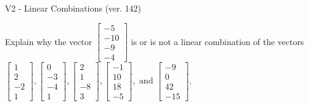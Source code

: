 \begin{exercise}
  \begin{exerciseTitle}V2 - Linear Combinations (ver. 142)\end{exerciseTitle}
  \begin{exerciseStatement}
    Explain why the vector \(\left[\begin{array}{c}
-5 \\
-10 \\
-9 \\
-4
\end{array}\right]\)  is or is not a linear 
	combination of the vectors \(\left[\begin{array}{c}
1 \\
2 \\
-2 \\
1
\end{array}\right] , \left[\begin{array}{c}
0 \\
-3 \\
-4 \\
1
\end{array}\right] , \left[\begin{array}{c}
2 \\
1 \\
-8 \\
3
\end{array}\right] , \left[\begin{array}{c}
-1 \\
10 \\
18 \\
-5
\end{array}\right] , \text{ and } \left[\begin{array}{c}
-9 \\
0 \\
42 \\
-15
\end{array}\right]\).
	



\end{exerciseStatement}
\end{exercise}
